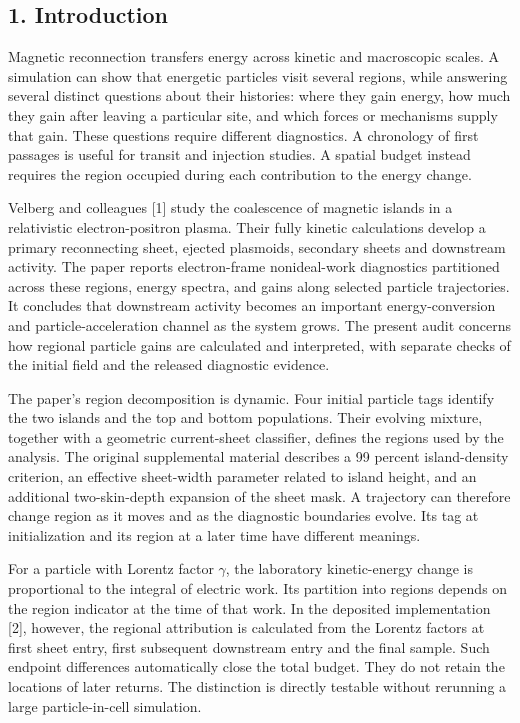 \subsection{1. Introduction}\label{introduction}

Magnetic reconnection transfers energy across kinetic and macroscopic
scales. A simulation can show that energetic particles visit several
regions, while answering several distinct questions about their
histories: where they gain energy, how much they gain after leaving a
particular site, and which forces or mechanisms supply that gain. These
questions require different diagnostics. A chronology of first passages
is useful for transit and injection studies. A spatial budget instead
requires the region occupied during each contribution to the energy
change.

Velberg and colleagues {[}1{]} study the coalescence of magnetic islands
in a relativistic electron-positron plasma. Their fully kinetic
calculations develop a primary reconnecting sheet, ejected plasmoids,
secondary sheets and downstream activity. The paper reports
electron-frame nonideal-work diagnostics partitioned across these
regions, energy spectra, and gains along selected particle trajectories.
It concludes that downstream activity becomes an important
energy-conversion and particle-acceleration channel as the system grows.
The present audit concerns how regional particle gains are calculated
and interpreted, with separate checks of the initial field and the
released diagnostic evidence.

The paper's region decomposition is dynamic. Four initial particle tags
identify the two islands and the top and bottom populations. Their
evolving mixture, together with a geometric current-sheet classifier,
defines the regions used by the analysis. The original supplemental
material describes a 99 percent island-density criterion, an effective
sheet-width parameter related to island height, and an additional
two-skin-depth expansion of the sheet mask. A trajectory can therefore
change region as it moves and as the diagnostic boundaries evolve. Its
tag at initialization and its region at a later time have different
meanings.

For a particle with Lorentz factor \(\gamma\), the laboratory
kinetic-energy change is proportional to the integral of electric work.
Its partition into regions depends on the region indicator at the time
of that work. In the deposited implementation {[}2{]}, however, the
regional attribution is calculated from the Lorentz factors at first
sheet entry, first subsequent downstream entry and the final sample.
Such endpoint differences automatically close the total budget. They do
not retain the locations of later returns. The distinction is directly
testable without rerunning a large particle-in-cell simulation.

